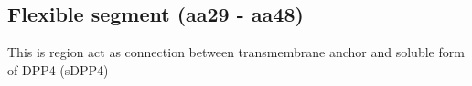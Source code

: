 \subsection{Flexible segment (aa29 - aa48)}

This is region act as connection between transmembrane anchor and soluble form of DPP4 (sDPP4) 
